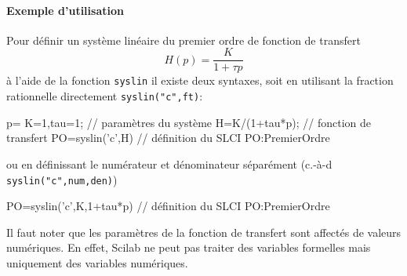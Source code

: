 \paragraph{Exemple d'utilisation}
Pour définir un système linéaire du premier ordre de fonction de transfert
\[
H(p)=\dfrac{K}{1+\tau p}
\]
à l'aide de la fonction \verb?syslin? il existe deux syntaxes, soit en 
utilisant la fraction rationnelle directement \verb?syslin("c",ft)?:
\begin{Scilabcode}
p=%
K=1,tau=1;             // paramètres du système
H=K/(1+tau*p);         // fonction de transfert
PO=syslin('c',H)       // définition du SLCI PO:PremierOrdre
\end{Scilabcode}
ou en définissant le numérateur et dénominateur séparément 
(c.-à-d \verb?syslin("c",num,den)?)
\begin{Scilabcode}
PO=syslin('c',K,1+tau*p)  // définition du SLCI PO:PremierOrdre
\end{Scilabcode}
Il faut noter que les paramètres de la fonction de transfert sont affectés 
de valeurs numériques. En effet, Scilab ne peut pas traiter des variables 
formelles mais uniquement des variables \og numériques\fg.
